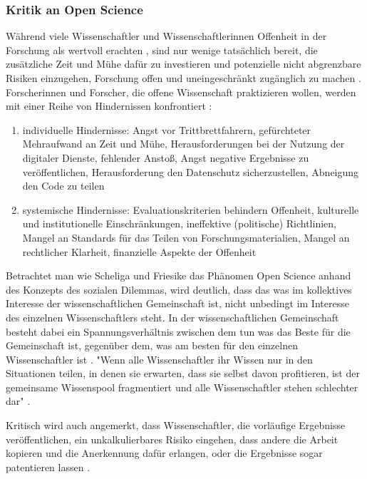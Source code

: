 \subsubsection{Kritik an Open Science}

Während viele Wissenschaftler und Wissenschaftlerinnen Offenheit in der Forschung als wertvoll erachten \cite{suchen}, sind nur wenige tatsächlich bereit, die zusätzliche Zeit und Mühe dafür zu investieren und potenzielle nicht abgrenzbare Risiken einzugehen, Forschung offen und uneingeschränkt zugänglich zu machen \cite{Scheliga_2014} \cite{Procter_2010}. Forscherinnen und Forscher, die offene Wissenschaft praktizieren wollen, werden mit einer Reihe von Hindernissen konfrontiert \cite{Scheliga_2014}:
\begin{enumerate}
\item individuelle Hindernisse: Angst vor Trittbrettfahrern, gefürchteter Mehraufwand an Zeit und Mühe, Herausforderungen bei der Nutzung der digitaler Dienste, fehlender Anstoß, Angst negative Ergebnisse zu veröffentlichen, Herausforderung den Datenschutz sicherzustellen, Abneigung den Code zu teilen
\item systemische Hindernisse: Evaluationskriterien behindern Offenheit, kulturelle und institutionelle Einschränkungen, ineffektive (politische) Richtlinien, Mangel an Standards für das Teilen von Forschungsmaterialien, Mangel an rechtlicher Klarheit, finanzielle Aspekte der Offenheit
\end{enumerate}

Betrachtet man wie Scheliga und Friesike das Phänomen Open Science anhand des Konzepts des sozialen Dilemmas, wird deutlich, dass das was im kollektives Interesse der wissenschaftlichen Gemeinschaft ist, nicht unbedingt im Interesse des einzelnen Wissenschaftlers steht. In der wissenschaftlichen Gemeinschaft besteht dabei ein Spannungsverhältnis zwischen dem tun was das Beste für die Gemeinschaft ist, gegenüber dem, was am besten für den einzelnen Wissenschaftler ist \cite{Ekins_2014} \cite{patlak_2010_open} \cite{wein_2010_erwerbung}. "Wenn alle Wissenschaftler ihr Wissen nur in den Situationen teilen, in denen sie erwarten, dass sie selbst davon profitieren, ist der gemeinsame Wissenspool fragmentiert und alle Wissenschaftler stehen schlechter dar" \cite{Scheliga_2014}.

Kritisch wird auch angemerkt, dass Wissenschaftler, die vorläufige Ergebnisse veröffentlichen, ein unkalkulierbares Risiko eingehen, dass andere die Arbeit kopieren und die Anerkennung dafür erlangen, oder die Ergebnisse sogar patentieren lassen \cite{Peters_2014}.

